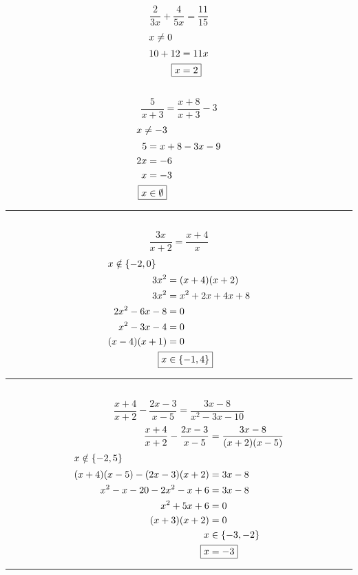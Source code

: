 	\subsection{}
		\[\frac{2}{3x} + \frac{4}{5x} = \frac{11}{15}\]
		\begin{align*}
			\intertext{$x \neq 0$}
			10 + 12 &= 11x \\
			\Aboxed{x &= 2}
		\end{align*}

	\subsection{}
		\[\frac{5}{x + 3} = \frac{x + 8}{x + 3} - 3\]
		\begin{align*}
			\intertext{$x \neq -3$}
			5 &= x + 8 - 3x - 9 \\
			2x &= -6 \\
			x &= -3 \\
			\Aboxed{x &\in \emptyset}
		\end{align*}
		\hrule{}

	\subsection{}
		\[\frac{3x}{x + 2} = \frac{x + 4}{x}\]
		\begin{align*}
			\intertext{$x \notin \{-2, 0\}$}
			3x^2 &= (x + 4)(x + 2) \\
			3x^2 &= x^2 + 2x + 4x + 8 \\
			2x^2 - 6x - 8 &= 0 \\
			x^2 - 3x - 4 &= 0 \\
			(x - 4)(x + 1) &= 0 \\
			\Aboxed{x &\in \{-1, 4\}}
		\end{align*}
		\hrule{}

	\subsection{}
		\[\frac{x + 4}{x + 2} - \frac{2x - 3}{x - 5} = \frac{3x - 8}{x^2 - 3x - 10}\]
		\begin{align*}
			\frac{x + 4}{x + 2} - \frac{2x - 3}{x - 5} &= \frac{3x - 8}{(x + 2)(x - 5)} \\
			\intertext{$x \notin \{-2, 5\}$}
			(x + 4)(x - 5) - (2x - 3)(x + 2) &= 3x - 8 \\
			x^2 - x - 20 - 2x^2 - x + 6 &= 3x - 8 \\
			x^2 + 5x + 6 &= 0 \\
			(x + 3)(x + 2) &= 0 \\
			x &\in \{-3, -2\} \\
			\Aboxed{x &= -3}
		\end{align*}
		\hrule{}

